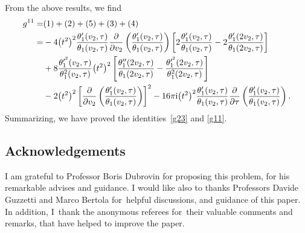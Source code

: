\documentclass[10pt,a4paper]{amsart}
\numberwithin{equation}{section}
\begin{document}
 From the above results, we find
\begin{align*}
g^{11}=&(1)+(2)+(5)+(3)+(4)\\
=&-4\big(t^2\big)^2\frac{\theta_1^{\prime}(v_2,\tau)}{\theta_1(v_2,\tau)}\frac{\partial}{\partial v_2}\left(\frac{\theta_1^{\prime}(v_2,\tau)}{\theta_1(v_2,\tau)}\right)\left[ 2\frac{\theta_1^{\prime}(v_2,\tau)}{\theta_1(v_2,\tau)} -2\frac{\theta_1^{\prime}(2v_2,\tau)}{\theta_1(2v_2,\tau)}\right]\\
&+8\frac{\theta_1^{\prime^2}(v_2,\tau)}{\theta_1^2(v_2,\tau)}\big(t^2\big)^2\left[\frac{\theta_1^{\prime\prime}(2v_2,\tau)}{\theta_1(2v_2,\tau)}-\frac{\theta_1^{\prime^2}(2v_2,\tau)}{\theta_1^2(2v_2,\tau)}\right]\\
&-2\big(t^2\big)^2\left[\frac{\partial}{\partial v_2}\left(\frac{\theta_1^{\prime}(v_2,\tau)}{\theta_1(v_2,\tau)}\right)\right]^2-16\pi {\rm i}\big(t^2\big)^2\frac{\theta_1^{\prime}(v_2,\tau)}{\theta_1(v_2,\tau)}\frac{\partial}{\partial \tau}\left(\frac{\theta_1^{\prime}(v_2,\tau)}{\theta_1(v_2,\tau)}\right).
\end{align*}
Summarizing, we have proved the identities~\eqref{g23} and \eqref{g11}.


\subsection*{Acknowledgements}
I am grateful to Professor Boris Dubrovin for proposing this problem, for his remarkable advi\-ses and guidance. I would like also to thanks Professors Davide Guzzetti and Marco Bertola for~helpful discussions, and guidance of this paper. In addition, I~thank the anonymous referees for~their valuable comments and remarks, that have helped to improve the paper.

\end{document}
